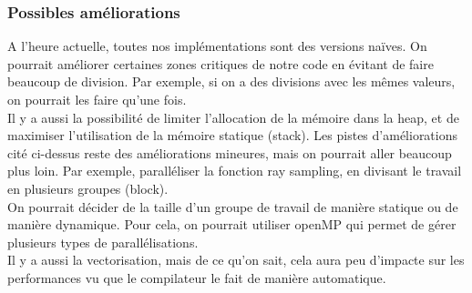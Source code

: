\subsubsection{Possibles améliorations}
A l'heure actuelle, toutes nos implémentations sont des versions naïves. On pourrait améliorer certaines zones critiques de notre code en évitant de faire beaucoup de division. Par exemple, si on a des divisions avec les mêmes valeurs, on pourrait les faire qu'une fois.\\
Il y a aussi la possibilité de limiter l'allocation de la mémoire dans la heap, et de maximiser l'utilisation de la mémoire statique (stack).
Les pistes d'améliorations cité ci-dessus reste des améliorations mineures, mais on pourrait aller beaucoup plus loin.
Par exemple, paralléliser la fonction ray sampling, en divisant le travail en plusieurs groupes (block).\\
On pourrait décider de la taille d'un groupe de travail de manière statique ou de manière dynamique.
Pour cela, on pourrait utiliser openMP qui permet de gérer plusieurs types de parallélisations.\\
Il y a aussi la vectorisation, mais de ce qu'on sait, cela aura peu d'impacte sur les performances vu que le compilateur le fait de manière automatique.
\pagebreak
